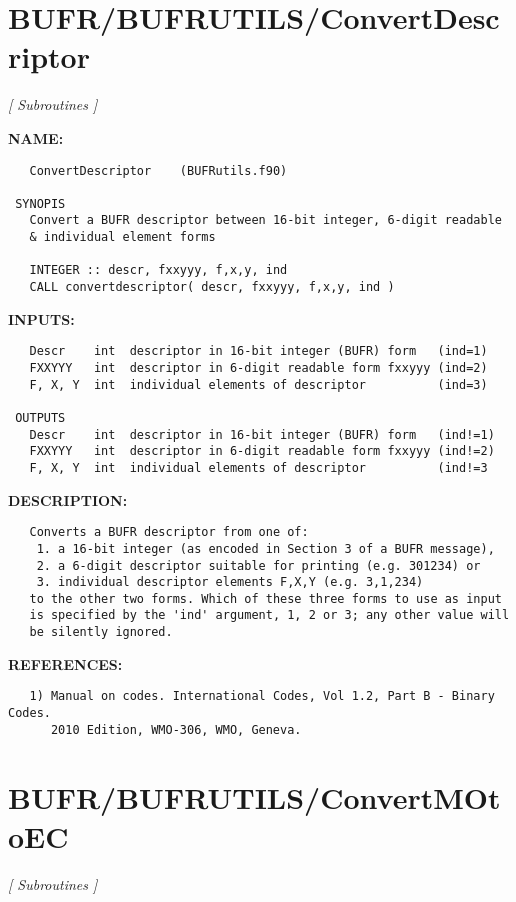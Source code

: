 \section{BUFR/BUFRUTILS/ConvertDescriptor}
\textsl{[ Subroutines ]}

\label{ch:robo4}
\label{ch:BUFR_BUFRUTILS_ConvertDescriptor}
\textbf{NAME:}\hspace{0.08in}\begin{Verbatim}
   ConvertDescriptor    (BUFRutils.f90)

 SYNOPIS
   Convert a BUFR descriptor between 16-bit integer, 6-digit readable
   & individual element forms

   INTEGER :: descr, fxxyyy, f,x,y, ind
   CALL convertdescriptor( descr, fxxyyy, f,x,y, ind )
\end{Verbatim}
\textbf{INPUTS:}\hspace{0.08in}\begin{Verbatim}
   Descr    int  descriptor in 16-bit integer (BUFR) form   (ind=1)
   FXXYYY   int  descriptor in 6-digit readable form fxxyyy (ind=2)
   F, X, Y  int  individual elements of descriptor          (ind=3)

 OUTPUTS
   Descr    int  descriptor in 16-bit integer (BUFR) form   (ind!=1)
   FXXYYY   int  descriptor in 6-digit readable form fxxyyy (ind!=2)
   F, X, Y  int  individual elements of descriptor          (ind!=3
\end{Verbatim}
\textbf{DESCRIPTION:}\hspace{0.08in}\begin{Verbatim}
   Converts a BUFR descriptor from one of:
    1. a 16-bit integer (as encoded in Section 3 of a BUFR message),
    2. a 6-digit descriptor suitable for printing (e.g. 301234) or
    3. individual descriptor elements F,X,Y (e.g. 3,1,234)
   to the other two forms. Which of these three forms to use as input
   is specified by the 'ind' argument, 1, 2 or 3; any other value will
   be silently ignored.
\end{Verbatim}
\textbf{REFERENCES:}\hspace{0.08in}\begin{Verbatim}
   1) Manual on codes. International Codes, Vol 1.2, Part B - Binary Codes.
      2010 Edition, WMO-306, WMO, Geneva.
\end{Verbatim}
\section{BUFR/BUFRUTILS/ConvertMOtoEC}
\textsl{[ Subroutines ]}

